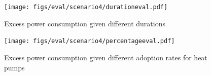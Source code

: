 \begin{figure}[!ht]
    \center
    \texttt{[image: figs/eval/scenario4/durationeval.pdf]}
    \caption{Excess power consumption given different durations}
    \label{warningmessagedifferentdurations}
\end{figure}


\begin{figure}[!ht]
    \center
    \texttt{[image: figs/eval/scenario4/percentageeval.pdf]}
    \caption{Excess power consumption given different adoption 
    rates for heat pumps}
    \label{warningmessagedifferentadoptionrates}
\end{figure}

